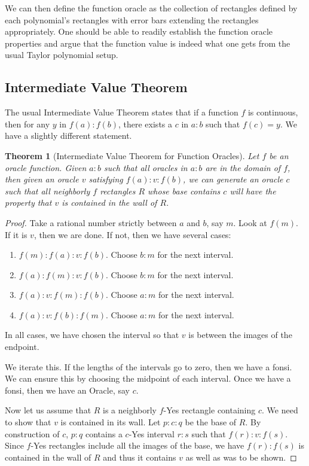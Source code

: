 \documentclass[12pt]{article}
\newtheorem{theorem}{Theorem}[subsection]
\theoremstyle{remark}
\begin{document}
We can then define the function oracle as the collection of rectangles defined by each polynomial's rectangles with error bars extending the rectangles appropriately. One should be able to readily establish the function oracle properties and argue that the function value is indeed what one gets from the usual Taylor polynomial setup. 



\subsection{Intermediate Value Theorem}

The usual Intermediate Value Theorem states that if a function $f$ is continuous, then for any $y$ in $f(a):f(b)$, there exists a $c$ in $a:b$ such that $f(c) = y$. We have a slightly different statement.

\begin{theorem}[Intermediate Value Theorem for Function Oracles]
Let $f$ be an oracle function. Given $a:b$ such that all oracles in $a:b$ are in the domain of $f$, then given an oracle $v$ satisfying $f(a):v:f(b)$, we can generate an oracle $c$ such that all neighborly $f$ rectangles $R$ whose base contains $c$ will have the property that $v$ is contained in the wall of $R$.
\end{theorem}

\begin{proof}
Take a rational number strictly between $a$ and $b$, say $m$. Look at $f(m)$. If it is $v$, then we are done. If not, then we have several cases: 
\begin{enumerate}
\item $f(m):f(a):v:f(b)$. Choose $b:m$ for the next interval.
\item $f(a):f(m):v:f(b)$. Choose $b:m$ for the next interval. 
\item $f(a):v:f(m):f(b)$. Choose $a:m$ for the next interval.
\item $f(a):v:f(b):f(m)$. Choose $a:m$ for the next interval. 
\end{enumerate}
In all cases, we have chosen the interval so that $v$ is between the images of the endpoint. 

We iterate this. If the lengths of the intervals go to zero, then we have a fonsi. We can ensure this by choosing the midpoint of each interval. Once we have a fonsi, then we have an Oracle, say $c$. 

Now let us assume that $R$ is a neighborly $f$-Yes rectangle containing $c$. We need to show that $v$ is contained in its wall. Let $p:c:q$ be the base of $R$. By construction of $c$, $p:q$ contains a $c$-Yes interval $r:s$ such that $f(r):v:f(s)$. Since $f$-Yes rectangles include all the images of the base, we have $f(r):f(s)$ is contained in the wall of $R$ and thus it contains $v$ as well as was to be shown. 
\end{proof}
\end{document}

